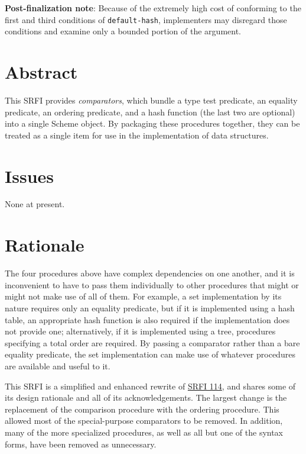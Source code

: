 \textbf{Post-finalization note}: Because of the extremely high cost of
conforming to the first and third conditions of \texttt{default-hash},
implementers may disregard those conditions and examine only a bounded
portion of the argument.

\section{Abstract}\label{abstract}

This SRFI provides \emph{comparators}, which bundle a type test
predicate, an equality predicate, an ordering predicate, and a hash
function (the last two are optional) into a single Scheme object. By
packaging these procedures together, they can be treated as a single
item for use in the implementation of data structures.

\section{Issues}\label{issues}

None at present.

\section{Rationale}\label{rationale}

The four procedures above have complex dependencies on one another, and
it is inconvenient to have to pass them individually to other procedures
that might or might not make use of all of them. For example, a set
implementation by its nature requires only an equality predicate, but if
it is implemented using a hash table, an appropriate hash function is
also required if the implementation does not provide one; alternatively,
if it is implemented using a tree, procedures specifying a total order
are required. By passing a comparator rather than a bare equality
predicate, the set implementation can make use of whatever procedures
are available and useful to it.

This SRFI is a simplified and enhanced rewrite of
\href{http://srfi.schemers.org/srfi-114/srfi-114.html}{SRFI 114}, and
shares some of its design rationale and all of its acknowledgements. The
largest change is the replacement of the comparison procedure with the
ordering procedure. This allowed most of the special-purpose comparators
to be removed. In addition, many of the more specialized procedures, as
well as all but one of the syntax forms, have been removed as
unnecessary.

